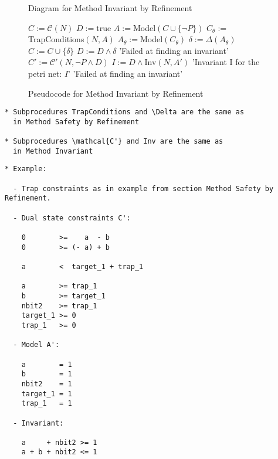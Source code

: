 \documentclass{llncs}
\begin{document}
\begin{figure}
\caption{Diagram for Method Invariant by Refinement}
\label{fig:method-invariant-by-refinement-diagram}
\end{figure}

\begin{figure}
\begin{algorithmic}[1]
\State $C := \mathcal C(N)$
\State $D := $true
  \State $A := $Model$(C \cup \{\neg P\})$
  \State $C_\theta := $TrapConditions$(N, A)$
    \State $A_\theta := $Model$(C_\theta)$
    \State $\delta := \Delta(A_\theta)$
    \State $C := C \cup \{\delta\}$
    \State $D := D \land \delta$
  \Else
    \State \Return 'Failed at finding an invariant'
  \EndIf
\EndWhile
\State $C' := \mathcal C'(N, \neg P \land D)$
  \State $I := D \land $Inv$(N, A')$
  \State \Return 'Invariant I for the petri net: $I$'
\Else
  \State \Return 'Failed at finding an invariant'
\EndIf
\end{algorithmic}
\caption{Pseudocode for Method Invariant by Refinement}
\label{fig:method-invariant-by-refinement-pseudocode}
\end{figure}

\begin{verbatim}
* Subprocedures TrapConditions and \Delta are the same as
  in Method Safety by Refinement

* Subprocedures \mathcal{C'} and Inv are the same as
  in Method Invariant
\end{verbatim}

\newpage

\begin{verbatim}
* Example:

  - Trap constraints as in example from section Method Safety by Refinement.
  
  - Dual state constraints C':

    0        >=    a  - b
    0        >= (- a) + b

    a        <  target_1 + trap_1

    a        >= trap_1
    b        >= target_1
    nbit2    >= trap_1
    target_1 >= 0
    trap_1   >= 0

  - Model A':

    a        = 1
    b        = 1
    nbit2    = 1
    target_1 = 1
    trap_1   = 1
    
  - Invariant:

    a     + nbit2 >= 1
    a + b + nbit2 <= 1
\end{verbatim}




\end{document}
